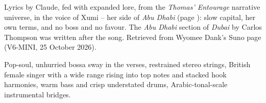 
\label{sec:not-a-favor}
\begin{notes}
Lyrics by Claude, fed with expanded lore, from the \emph{Thomas' Entourage} narrative universe, in the voice of Xumi -- her side of \emph{Abu Dhabi} (page \pageref{sec:abu-dhabi}): slow capital, her own terms, and no boss and no favour. The \emph{Abu Dhabi} section of \emph{Dubai} by Carlos Thompson was written after the song. Retrieved from Wyomee Dank's Suno page (V6-MINI, 25 October 2026).
\end{notes}
\begin{style}
Pop-soul, unhurried bossa sway in the verses, restrained stereo strings, British female singer with a wide range rising into top notes and stacked hook harmonies, warm bass and crisp understated drums, Arabic-tonal-scale instrumental bridges.
\end{style}
